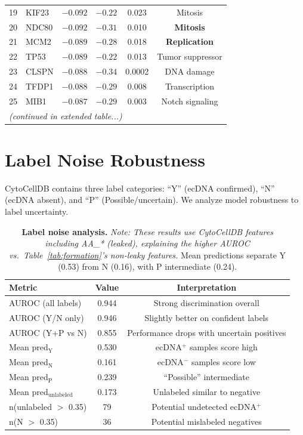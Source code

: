 \documentclass{article}
\begin{document}
\begin{table}[H]
\begin{tabular}{@{}rlcccc@{}}
19 & KIF23 & $-0.092$ & $-0.22$ & 0.023 & Mitosis \\
20 & NDC80 & $-0.092$ & $-0.31$ & 0.010 & \textbf{Mitosis} \\
21 & MCM2 & $-0.089$ & $-0.28$ & 0.018 & \textbf{Replication} \\
22 & TP53 & $-0.089$ & $-0.22$ & 0.013 & Tumor suppressor \\
23 & CLSPN & $-0.088$ & $-0.34$ & 0.0002 & DNA damage \\
24 & TFDP1 & $-0.088$ & $-0.29$ & 0.008 & Transcription \\
25 & MIB1 & $-0.087$ & $-0.29$ & 0.003 & Notch signaling \\
\midrule
\multicolumn{6}{l}{\textit{(continued in extended table...)}} \\
\bottomrule
\end{tabular}
\end{table}


\section{Label Noise Robustness}
\label{app:noise}

CytoCellDB contains three label categories: ``Y'' (ecDNA confirmed), ``N'' (ecDNA absent), and ``P'' (Possible/uncertain). We analyze model robustness to label uncertainty.

\begin{table}[ht]
\caption{\textbf{Label noise analysis.} \textit{Note: These results use CytoCellDB features including AA\_* (leaked), explaining the higher AUROC vs.\ Table~\ref{tab:formation}'s non-leaky features.} Mean predictions separate Y (0.53) from N (0.16), with P intermediate (0.24).}
\label{tab:noise}
\centering
\small
\begin{tabular}{@{}lcc@{}}
\toprule
Metric & Value & Interpretation \\
\midrule
AUROC (all labels) & 0.944 & Strong discrimination overall \\
AUROC (Y/N only) & 0.946 & Slightly better on confident labels \\
AUROC (Y+P vs N) & 0.855 & Performance drops with uncertain positives \\
\midrule
Mean pred$_{\text{Y}}$ & 0.530 & ecDNA$^+$ samples score high \\
Mean pred$_{\text{N}}$ & 0.161 & ecDNA$^-$ samples score low \\
Mean pred$_{\text{P}}$ & 0.239 & ``Possible'' intermediate \\
Mean pred$_{\text{unlabeled}}$ & 0.173 & Unlabeled similar to negative \\
\midrule
n(unlabeled $>$ 0.35) & 79 & Potential undetected ecDNA$^+$ \\
n(N $>$ 0.35) & 36 & Potential mislabeled negatives \\
\bottomrule
\end{tabular}
\end{table}
\end{document}
